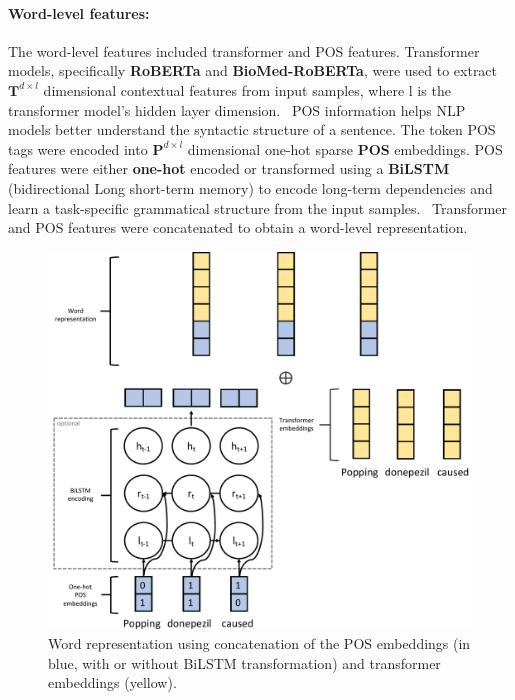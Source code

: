 \documentclass[11pt]{article}
\begin{document}
\paragraph{Word-level features: }
%
The word-level features included transformer and POS features.
Transformer models, specifically \textbf{RoBERTa} and \textbf{BioMed-RoBERTa}, were used to extract $\mathbf{T}^{d \times l}$ dimensional contextual features from input samples, where l is the transformer model's hidden layer dimension.~\cite{liu2019roberta,gururangan2020don}
POS information helps NLP models better understand the syntactic structure of a sentence.
The token POS tags were encoded into $\mathbf{P}^{d \times l}$ dimensional one-hot sparse \textbf{POS} embeddings.
POS features were either \textbf{one-hot} encoded or transformed using a \textbf{BiLSTM} (bidirectional Long short-term memory) to encode long-term dependencies and learn a task-specific grammatical structure from the input samples.~\cite{hochreiter1997long}
Transformer and POS features were concatenated to obtain a word-level representation.
\begin{figure}[!htbp]
    \centering
    \includegraphics[width=\columnwidth]{figures/word_arch.pdf}
    \caption{Word representation using concatenation of the POS embeddings (in blue, with or without BiLSTM transformation) and transformer embeddings (yellow).}
    \label{fig:task2_word}
\end{figure}
%
%
%
\end{document}
